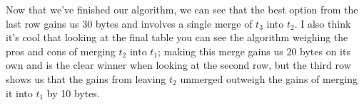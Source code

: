 \documentclass{article}[12]
\begin{document}
Now that we've finished our algorithm, we can see that the best option from the last row gains us 30 bytes and involves a single merge of $t_3$ into $t_2$. I also think it's cool that looking at the final table you can see the algorithm weighing the pros and cons of merging $t_2$ into $t_1$; making this merge gains us 20 bytes on its own and is the clear winner when looking at the second row, but the third row shows us that the gains from leaving $t_2$ unmerged outweigh the gains of merging it into $t_1$ by 10 bytes.
\end{document}
